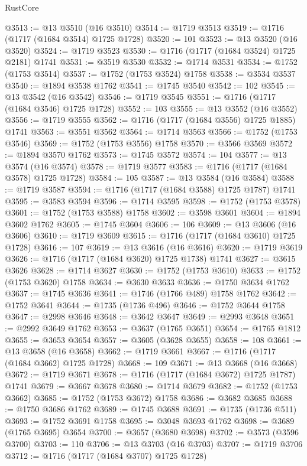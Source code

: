 \begin{lexlean}{RustCore}
\begin{coremodule}
@3513 := @13 @3510 (@16 @3510)
@3514 := @1719 @3513
@3519 := @1716 (@1717 (@1684 @3514) @1725 @1728)
@3520 := 101
@3523 := @13 @3520 (@16 @3520)
@3524 := @1719 @3523
@3530 := @1716 (@1717 (@1684 @3524) @1725 @2181) @1741
@3531 := @3519 @3530
@3532 := @1714 @3531
@3534 := @1752 (@1753 @3514)
@3537 := @1752 (@1753 @3524) @1758
@3538 := @3534 @3537
@3540 := @1894 @3538 @1762
@3541 := @1745 @3540
@3542 := 102
@3545 := @13 @3542 (@16 @3542)
@3546 := @1719 @3545
@3551 := @1716 (@1717 (@1684 @3546) @1725 @1728)
@3552 := 103
@3555 := @13 @3552 (@16 @3552)
@3556 := @1719 @3555
@3562 := @1716 (@1717 (@1684 @3556) @1725 @1885) @1741
@3563 := @3551 @3562
@3564 := @1714 @3563
@3566 := @1752 (@1753 @3546)
@3569 := @1752 (@1753 @3556) @1758
@3570 := @3566 @3569
@3572 := @1894 @3570 @1762
@3573 := @1745 @3572
@3574 := 104
@3577 := @13 @3574 (@16 @3574)
@3578 := @1719 @3577
@3583 := @1716 (@1717 (@1684 @3578) @1725 @1728)
@3584 := 105
@3587 := @13 @3584 (@16 @3584)
@3588 := @1719 @3587
@3594 := @1716 (@1717 (@1684 @3588) @1725 @1787) @1741
@3595 := @3583 @3594
@3596 := @1714 @3595
@3598 := @1752 (@1753 @3578)
@3601 := @1752 (@1753 @3588) @1758
@3602 := @3598 @3601
@3604 := @1894 @3602 @1762
@3605 := @1745 @3604
@3606 := 106
@3609 := @13 @3606 (@16 @3606)
@3610 := @1719 @3609
@3615 := @1716 (@1717 (@1684 @3610) @1725 @1728)
@3616 := 107
@3619 := @13 @3616 (@16 @3616)
@3620 := @1719 @3619
@3626 := @1716 (@1717 (@1684 @3620) @1725 @1738) @1741
@3627 := @3615 @3626
@3628 := @1714 @3627
@3630 := @1752 (@1753 @3610)
@3633 := @1752 (@1753 @3620) @1758
@3634 := @3630 @3633
@3636 := @1750 @3634 @1762
@3637 := @1745 @3636
@3641 := @1746 (@1766 @489) @1758 @1762
@3642 := @1752 @3641
@3644 := @1735 (@1736 @496)
@3646 := @1752 @3644 @1758
@3647 := @2998 @3646
@3648 := @3642 @3647
@3649 := @2993 @3648
@3651 := @2992 @3649 @1762
@3653 := @3637 (@1765 @3651)
@3654 := @1765 @1812
@3655 := @3653 @3654
@3657 := @3605 (@3628 @3655)
@3658 := 108
@3661 := @13 @3658 (@16 @3658)
@3662 := @1719 @3661
@3667 := @1716 (@1717 (@1684 @3662) @1725 @1728)
@3668 := 109
@3671 := @13 @3668 (@16 @3668)
@3672 := @1719 @3671
@3678 := @1716 (@1717 (@1684 @3672) @1725 @1787) @1741
@3679 := @3667 @3678
@3680 := @1714 @3679
@3682 := @1752 (@1753 @3662)
@3685 := @1752 (@1753 @3672) @1758
@3686 := @3682 @3685
@3688 := @1750 @3686 @1762
@3689 := @1745 @3688
@3691 := @1735 (@1736 @511)
@3693 := @1752 @3691 @1758
@3695 := @3048 @3693 @1762
@3698 := @3689 (@1765 @3695) @3654
@3700 := @3657 (@3680 @3698)
@3702 := @3573 (@3596 @3700)
@3703 := 110
@3706 := @13 @3703 (@16 @3703)
@3707 := @1719 @3706
@3712 := @1716 (@1717 (@1684 @3707) @1725 @1728)

\end{coremodule}
\end{lexlean}
